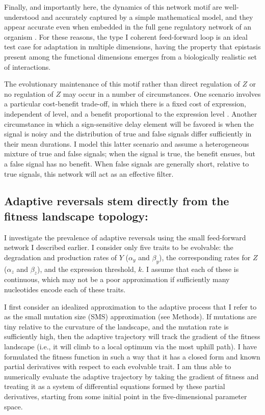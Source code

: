 \documentclass[dvips,12pt,twoside,titlepage]{article}
\begin{document}
Finally, and importantly here, the dynamics of this network motif are well-understood and accurately captured by a simple mathematical model, and they appear accurate even when embedded in the full gene regulatory network of an organism \cite{Mangan:2003vl}. For these reasons, the type I coherent feed-forward loop is an ideal test case for adaptation in multiple dimensions, having the property that epistasis present among the functional dimensions emerges from a biologically realistic set of interactions. 

The evolutionary maintenance of this motif rather than direct regulation of $Z$ or no regulation of $Z$ may occur in a number of circumstances. 
One scenario involves a particular cost-benefit trade-off, in which there is a fixed cost of expression, independent of level, and a benefit proportional to the expression level \cite{Dekel:2005bd}. Another circumstance in which a sign-sensitive delay element will be favored is when the signal is noisy and the distribution of true and false signals differ sufficiently in their mean durations. I model this latter scenario and assume a heterogeneous mixture of true and false signals; when the signal is true, the benefit ensues, but a false signal has no benefit. When false signals are generally short, relative to true signals, this network will act as an effective filter.

\subsection*{Adaptive reversals stem directly from the fitness landscape topology:}

I investigate the prevalence of adaptive reversals using the small feed-forward network I described earlier. 
I consider only five traits to be evolvable: the degradation and production rates of $Y$ ($\alpha_y$ and $\beta_y$), the corresponding rates for $Z$ ($\alpha_z$ and $\beta_z$), and the expression threshold, $k$. I assume that each of these is continuous, which may not be a poor approximation if sufficiently many nucleotides encode each of these traits.

I first consider an idealized approximation to the adaptive process that I refer to as the small mutation size (SMS) approximation (see Methods). 
If mutations are tiny relative to the curvature of the landscape, and the mutation rate is sufficiently high, then the adaptive trajectory will track the gradient of the fitness landscape (i.e., it will climb to a local optimum via the most uphill path). 
I have formulated the fitness function in such a way that it has a closed form and known partial derivatives with respect to each evolvable trait. 
I am thus able to numerically evaluate the adaptive trajectory by taking the gradient of fitness and treating it as a system of differential equations formed by these partial derivatives, starting from some initial point in the five-dimensional parameter space. 
\end{document}
